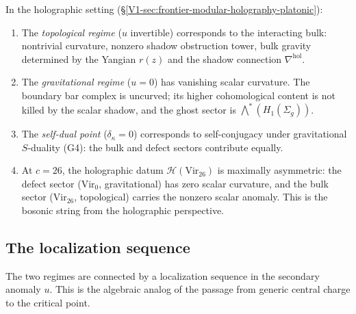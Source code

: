 \begin{remark}
In the holographic setting
(\S\ref{V1-sec:frontier-modular-holography-platonic}):
\begin{enumerate}[label=\textup{(\alph*)}]
\item The \emph{topological regime} ($u$ invertible) corresponds to
the interacting bulk: nontrivial curvature, nonzero shadow obstruction tower,
bulk gravity determined by the Yangian $r(z)$ and the shadow
connection $\nabla^{\mathrm{hol}}$.

\item The \emph{gravitational regime} ($u = 0$) has vanishing scalar
curvature. The boundary bar complex is uncurved; its higher
cohomological content is not killed by the scalar shadow, and the
ghost sector is $\bigwedge^*(H_1(\Sigma_g))$.

\item The \emph{self-dual point} ($\delta_\kappa = 0$)
corresponds to self-conjugacy under gravitational $S$-duality (G4):
the bulk and defect sectors contribute equally.

\item At $c = 26$, the holographic datum
$\mathcal{H}(\mathrm{Vir}_{26})$ is maximally asymmetric: the defect
sector ($\mathrm{Vir}_0$, gravitational) has zero scalar curvature,
and the bulk sector ($\mathrm{Vir}_{26}$, topological) carries the
nonzero scalar anomaly. This is the bosonic string from the
holographic perspective.
\end{enumerate}
\end{remark}

%
%

\subsection{The localization sequence}

The two regimes are connected by a localization sequence in the
secondary anomaly $u$. This is the algebraic analog of the passage
from generic central charge to the critical point.

